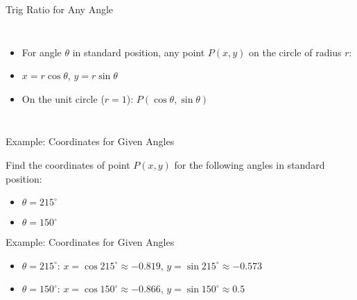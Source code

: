 \documentclass[aspectratio=169]{beamer}
\begin{document}
\begin{frame}{Trig Ratio for Any Angle}
    \begin{tcolorbox}[colback=lightgray,colframe=accent,title=Coordinates on the Circle]
        \footnotesize
        \begin{columns}
            \begin{itemize}
                \item For angle $\theta$ in standard position, any point $P(x, y)$ on the circle of radius $r$:
                \item $x = r \cos \theta$, $y = r \sin \theta$
                \item On the unit circle ($r=1$): $P(\cos\theta, \sin\theta)$
            \end{itemize}
        \end{columns}
    \end{tcolorbox}
\end{frame}

\begin{frame}{Example: Coordinates for Given Angles}
    \begin{tcolorbox}[colback=lightgray,colframe=primary,title=Question]
        \footnotesize
        Find the coordinates of point $P(x,y)$ for the following angles in standard position:
        \begin{itemize}
            \item $\theta = 215^\circ$
            \item $\theta = 150^\circ$
        \end{itemize}
    \end{tcolorbox}
\end{frame}

\begin{frame}{Example: Coordinates for Given Angles}
    \begin{tcolorbox}[colback=lightgray,colframe=primary,title=Solution]
        \footnotesize
        \begin{itemize}
            \item $\theta = 215^\circ$: $x = \cos 215^\circ \approx -0.819$, $y = \sin 215^\circ \approx -0.573$
            \item $\theta = 150^\circ$: $x = \cos 150^\circ \approx -0.866$, $y = \sin 150^\circ \approx 0.5$
        \end{itemize}
    \end{tcolorbox}
\end{frame}
\end{document}
